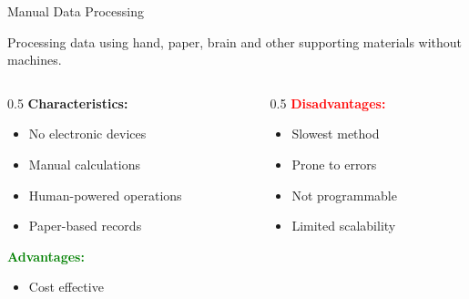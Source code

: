 \documentclass[aspectratio=169]{beamer}
\begin{document}
\begin{frame}{Manual Data Processing}
    \begin{definition}
        Processing data using hand, paper, brain and other supporting materials without machines.
    \end{definition}
    
    \vspace{0.5cm}
    \begin{columns}
        \begin{column}{0.5\textwidth}
            \textbf{Characteristics:}
            \begin{itemize}
                \item No electronic devices
                \item Manual calculations
                \item Human-powered operations
                \item Paper-based records
            \end{itemize}
            
            \vspace{0.3cm}
            \textbf{\textcolor{green}{Advantages:}}
            \begin{itemize}
                \item[\faCheck] Cost effective
            \end{itemize}
        \end{column}
        \begin{column}{0.5\textwidth}
            \textbf{\textcolor{red}{Disadvantages:}}
            \begin{itemize}
                \item[\faTimes] Slowest method
                \item[\faTimes] Prone to errors
                \item[\faTimes] Not programmable
                \item[\faTimes] Limited scalability
            \end{itemize}
            
        \end{column}
    \end{columns}
\end{frame}
\end{document}
